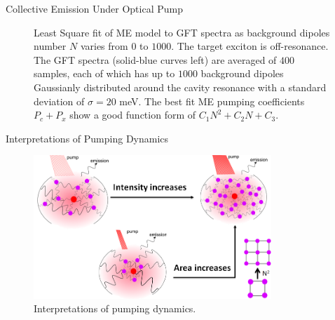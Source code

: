 \documentclass{beamer}
\begin{document}
\begin{frame}{Collective Emission Under Optical Pump}

\begin{figure}[htp]%
     \centering
       \caption[Pumping as a tool for dipoles excitation.]{ \fontsize{8}{0.2}\selectfont
       Least Square fit of ME model to GFT spectra as background dipoles number $N$ varies from $0$ to $1000$. The target exciton is off-resonance. The GFT spectra (solid-blue curves left) are averaged of $400$ samples, each of which has up to $1000$ background dipoles Gaussianly distributed around the cavity resonance with a standard deviation of $\sigma=20$ meV. The best fit ME pumping coefficients $P_c+P_x$ show a good function form of $C_1N^2+C_2N+C_3$.
       }
   \end{figure}
\end{frame}

\begin{frame}{Interpretations of Pumping Dynamics}
\begin{figure}[htp]%
\centering
\begin{center}
\includegraphics[width=0.8\textwidth]{./Figs/pumpingdynamics}
\end{center}
\caption[Pumping a cavity.]{\fontsize{8}{-0.2}\selectfont Interpretations of pumping dynamics.}
\label{pumpdyn}
\end{figure}
\end{frame}
\end{document}
